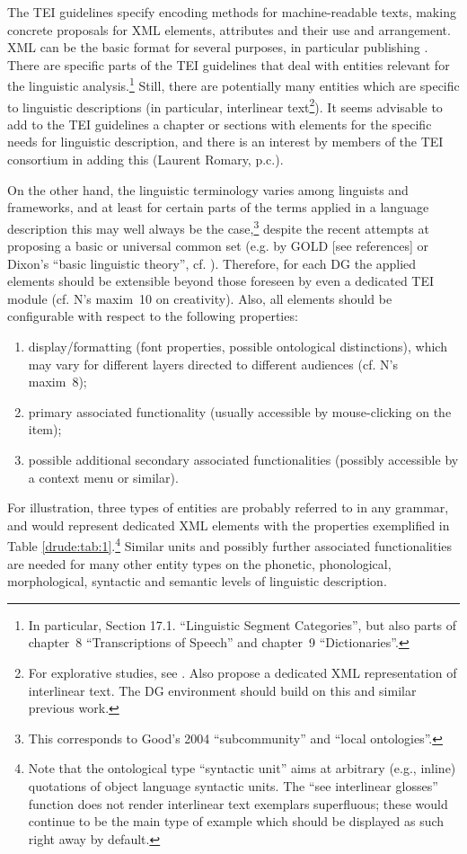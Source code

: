 The TEI guidelines \citep{TEIConsortium2009} specify encoding methods for machine-readable texts, making concrete proposals for XML elements, attributes and their use and arrangement. XML can be the basic format for several purposes, in particular publishing \citep{ReedEtAl2009}. There are specific parts of the TEI guidelines that deal with entities relevant for the linguistic analysis.\footnote{In 
 particular, Section 17.1. ``Linguistic Segment Categories'', but also parts of chapter~8 ``Transcriptions of Speech'' and chapter~9 ``Dictionaries''.
} 
Still, there are potentially many entities which are specific to linguistic descriptions (in particular, interlinear text\footnote{For 
 explorative studies, see \citet{BowEtAl2003tgmilt,BowEtAl2003a4lmilt,HughesEtAl2004}. Also \citet{PalmerEtAl2007} propose a dedicated XML representation of interlinear text. The DG environment should build on this and similar previous work.
}). 
It seems advisable to add to the TEI guidelines a chapter or sections with elements for the specific needs for linguistic description, and there is an interest by members of the TEI consortium in adding this (Laurent Romary, p.c.).

On the other hand, the linguistic terminology varies among linguists and frameworks, and at least for certain parts of the terms applied in a language description this may well always be the case,\footnote{This 
 corresponds to Good's 2004 ``subcommunity'' and ``local ontologies''.
} despite the recent attempts at proposing a basic or universal common set (e.g. by GOLD [see references] or Dixon's ``basic linguistic theory'', cf. \citet{Dixon2010}). Therefore, for each DG the applied elements should be extensible beyond those foreseen by even a dedicated TEI module (cf. N's maxim~10 on creativity). Also, all elements should be configurable with respect to the following properties:

\begin{enumerate}
\item display/formatting (font properties, possible ontological distinctions), which may vary for different layers directed to different audiences (cf. N's maxim~8);
\item primary associated functionality (usually accessible by mouse-clicking on the item);
\item possible additional secondary associated functionalities (possibly accessible by a context menu or similar). 
\end{enumerate}

For illustration, three types of entities are probably referred to in any grammar, and would represent dedicated XML elements with the properties exemplified in Table \ref{drude:tab:1}.\footnote{Note 
 that the ontological type ``syntactic unit'' aims at arbitrary (e.g., inline) quotations of object language syntactic units. The ``see interlinear glosses'' function does not render interlinear text exemplars superfluous; these would continue to be the main type of example which should be displayed as such right away by default.
} 
Similar units and possibly further associated functionalities are needed for many other entity types on the phonetic, phonological, morphological, syntactic and semantic levels of linguistic description.

